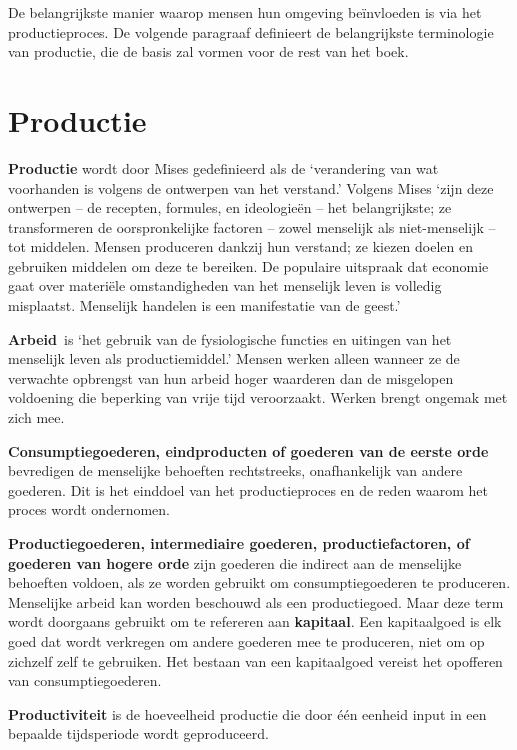 De belangrijkste manier waarop mensen hun omgeving beïnvloeden is via
het productieproces. De volgende paragraaf definieert de belangrijkste
terminologie van productie, die de basis zal vormen voor de rest van het
boek.

\section{Productie}

\textbf{Productie} wordt door Mises gedefinieerd als de `verandering van
wat voorhanden is volgens de ontwerpen van het verstand.' Volgens Mises
`zijn deze ontwerpen -- de recepten, formules, en ideologieën -- het
belangrijkste; ze transformeren de oorspronkelijke factoren -- zowel
menselijk als niet-menselijk -- tot middelen. Mensen produceren dankzij
hun verstand; ze kiezen doelen en gebruiken middelen om deze te
bereiken. De populaire uitspraak dat economie gaat over materiële
omstandigheden van het menselijk leven is volledig misplaatst. Menselijk
handelen is een manifestatie van de geest.'\autocite{39}

\textbf{Arbeid}~is `het gebruik van de fysiologische functies en
uitingen van het menselijk leven als productiemiddel.'\autocite{40} Mensen werken alleen wanneer ze de verwachte opbrengst van hun arbeid
hoger waarderen dan de misgelopen voldoening die beperking van vrije
tijd veroorzaakt. Werken brengt ongemak met zich mee.

\textbf{Consumptiegoederen, eindproducten of goederen van de eerste
orde} bevredigen de menselijke behoeften rechtstreeks, onafhankelijk van
andere goederen. Dit is het einddoel van het productieproces en de reden
waarom het proces wordt ondernomen.

\textbf{Productiegoederen, intermediaire goederen, productiefactoren, of
goederen van hogere orde} zijn goederen die indirect aan de menselijke
behoeften voldoen, als ze worden gebruikt om consumptiegoederen te
produceren. Menselijke arbeid kan worden beschouwd als een
productiegoed. Maar deze term wordt doorgaans gebruikt om te refereren
aan \textbf{kapitaal}. Een kapitaalgoed is elk goed dat wordt verkregen
om andere goederen mee te produceren, niet om op zichzelf zelf te
gebruiken. Het bestaan van een kapitaalgoed vereist het opofferen van
consumptiegoederen.

\textbf{Productiviteit} is de hoeveelheid productie die door één eenheid
input in een bepaalde tijdsperiode wordt geproduceerd.

